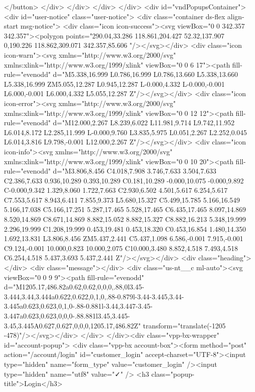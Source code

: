 {{{{{{{      </button>
    </div>
  </div>
</div>
</div>
  <div id="vndPopupsContainer"><div id="user-notice" class="user-notice">
  <div class="container ds-flex align-start msg-notice">
    <div class="icon icon-success"><svg viewBox="0 0 342.357 342.357"><polygon points="290.04,33.286 118.861,204.427 52.32,137.907 0,190.226 118.862,309.071 342.357,85.606 "/></svg></div>
    <div class="icon icon-warn"><svg xmlns="http://www.w3.org/2000/svg" xmlns:xlink="http://www.w3.org/1999/xlink" viewBox="0 0 6 17"><path fill-rule="evenodd" d="M5.338,16.999 L0.786,16.999 L0.786,13.660 L5.338,13.660 L5.338,16.999 ZM5.055,12.287 L0.945,12.287 L-0.000,4.332 L-0.000,-0.001 L6.000,-0.001 L6.000,4.332 L5.055,12.287 Z"/></svg></div>
    <div class="icon icon-error"><svg xmlns="http://www.w3.org/2000/svg" xmlns:xlink="http://www.w3.org/1999/xlink" viewBox="0 0 12 12"><path fill-rule="evenodd" d="M12.000,2.267 L8.239,6.022 L11.981,9.714 L9.742,11.952 L6.014,8.172 L2.285,11.999 L-0.000,9.760 L3.835,5.975 L0.051,2.267 L2.252,0.045 L6.014,3.816 L9.798,-0.001 L12.000,2.267 Z"/></svg></div>
    <div class="icon icon-info"><svg xmlns="http://www.w3.org/2000/svg" xmlns:xlink="http://www.w3.org/1999/xlink" viewBox="0 0 10 20"><path fill-rule="evenodd" d="M3.806,8.456 C4.018,7.908 3.746,7.633 3.504,7.633 C2.386,7.633 0.936,10.289 0.393,10.289 C0.181,10.289 -0.000,10.075 -0.000,9.892 C-0.000,9.342 1.329,8.060 1.722,7.663 C2.930,6.502 4.501,5.617 6.254,5.617 C7.553,5.617 8.943,6.411 7.855,9.373 L5.680,15.327 C5.499,15.785 5.166,16.549 5.166,17.038 C5.166,17.251 5.287,17.465 5.528,17.465 C6.435,17.465 8.097,14.869 8.520,14.869 C8.671,14.869 8.882,15.052 8.882,15.327 C8.882,16.213 5.348,19.999 2.296,19.999 C1.208,19.999 0.453,19.481 0.453,18.320 C0.453,16.854 1.480,14.350 1.692,13.831 L3.806,8.456 ZM5.437,2.441 C5.437,1.098 6.586,-0.001 7.915,-0.001 C9.124,-0.001 10.000,0.823 10.000,2.075 C10.000,3.480 8.852,4.518 7.493,4.518 C6.254,4.518 5.437,3.693 5.437,2.441 Z"/></svg></div>
    <div class="heading"></div>
    <div class="message"></div>
    <div class="us-nt__c ml-auto"><svg viewBox="0 0 9 9"><path fill-rule="evenodd" d="M1205.17,486.82a0.62,0.62,0,0,0,.88,0l3.45-3.444,3.44,3.444a0.622,0.622,0,1,0,.88-0.879l-3.44-3.445,3.44-3.445a0.623,0.623,0,1,0-.88-0.881l-3.44,3.447-3.45-3.447a0.623,0.623,0,0,0-.88.881l3.45,3.445-3.45,3.445A0.627,0.627,0,0,0,1205.17,486.82Z" transform="translate(-1205 -478)"/></svg></div>
  </div>
</div><div class="vpp-bx-wrapper" id="account-popup">
<div class="vpp-bx account-box"><form method="post" action="/account/login" id="customer_login" accept-charset="UTF-8"><input type="hidden" name="form_type" value="customer_login" /><input type="hidden" name="utf8" value="✓" />
        <h3 class="popup-title">Login</h3>

}}}}}}}
